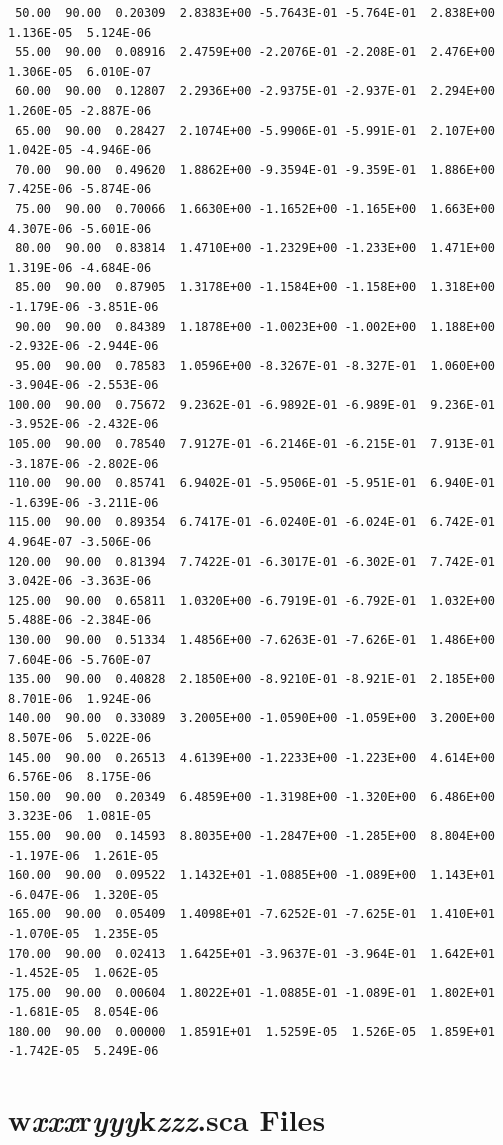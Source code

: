 \begin{appendix}
{\begin{verbatim}
 50.00  90.00  0.20309  2.8383E+00 -5.7643E-01 -5.764E-01  2.838E+00  1.136E-05  5.124E-06
 55.00  90.00  0.08916  2.4759E+00 -2.2076E-01 -2.208E-01  2.476E+00  1.306E-05  6.010E-07
 60.00  90.00  0.12807  2.2936E+00 -2.9375E-01 -2.937E-01  2.294E+00  1.260E-05 -2.887E-06
 65.00  90.00  0.28427  2.1074E+00 -5.9906E-01 -5.991E-01  2.107E+00  1.042E-05 -4.946E-06
 70.00  90.00  0.49620  1.8862E+00 -9.3594E-01 -9.359E-01  1.886E+00  7.425E-06 -5.874E-06
 75.00  90.00  0.70066  1.6630E+00 -1.1652E+00 -1.165E+00  1.663E+00  4.307E-06 -5.601E-06
 80.00  90.00  0.83814  1.4710E+00 -1.2329E+00 -1.233E+00  1.471E+00  1.319E-06 -4.684E-06
 85.00  90.00  0.87905  1.3178E+00 -1.1584E+00 -1.158E+00  1.318E+00 -1.179E-06 -3.851E-06
 90.00  90.00  0.84389  1.1878E+00 -1.0023E+00 -1.002E+00  1.188E+00 -2.932E-06 -2.944E-06
 95.00  90.00  0.78583  1.0596E+00 -8.3267E-01 -8.327E-01  1.060E+00 -3.904E-06 -2.553E-06
100.00  90.00  0.75672  9.2362E-01 -6.9892E-01 -6.989E-01  9.236E-01 -3.952E-06 -2.432E-06
105.00  90.00  0.78540  7.9127E-01 -6.2146E-01 -6.215E-01  7.913E-01 -3.187E-06 -2.802E-06
110.00  90.00  0.85741  6.9402E-01 -5.9506E-01 -5.951E-01  6.940E-01 -1.639E-06 -3.211E-06
115.00  90.00  0.89354  6.7417E-01 -6.0240E-01 -6.024E-01  6.742E-01  4.964E-07 -3.506E-06
120.00  90.00  0.81394  7.7422E-01 -6.3017E-01 -6.302E-01  7.742E-01  3.042E-06 -3.363E-06
125.00  90.00  0.65811  1.0320E+00 -6.7919E-01 -6.792E-01  1.032E+00  5.488E-06 -2.384E-06
130.00  90.00  0.51334  1.4856E+00 -7.6263E-01 -7.626E-01  1.486E+00  7.604E-06 -5.760E-07
135.00  90.00  0.40828  2.1850E+00 -8.9210E-01 -8.921E-01  2.185E+00  8.701E-06  1.924E-06
140.00  90.00  0.33089  3.2005E+00 -1.0590E+00 -1.059E+00  3.200E+00  8.507E-06  5.022E-06
145.00  90.00  0.26513  4.6139E+00 -1.2233E+00 -1.223E+00  4.614E+00  6.576E-06  8.175E-06
150.00  90.00  0.20349  6.4859E+00 -1.3198E+00 -1.320E+00  6.486E+00  3.323E-06  1.081E-05
155.00  90.00  0.14593  8.8035E+00 -1.2847E+00 -1.285E+00  8.804E+00 -1.197E-06  1.261E-05
160.00  90.00  0.09522  1.1432E+01 -1.0885E+00 -1.089E+00  1.143E+01 -6.047E-06  1.320E-05
165.00  90.00  0.05409  1.4098E+01 -7.6252E-01 -7.625E-01  1.410E+01 -1.070E-05  1.235E-05
170.00  90.00  0.02413  1.6425E+01 -3.9637E-01 -3.964E-01  1.642E+01 -1.452E-05  1.062E-05
175.00  90.00  0.00604  1.8022E+01 -1.0885E-01 -1.089E-01  1.802E+01 -1.681E-05  8.054E-06
180.00  90.00  0.00000  1.8591E+01  1.5259E-05  1.526E-05  1.859E+01 -1.742E-05  5.249E-06
\end{verbatim}
}
\newpage\section{ w{\it xxx}r{\it yyy}k{\it zzz}.sca Files
	\label{app:w000r000k000.sca}}


\end{appendix}
